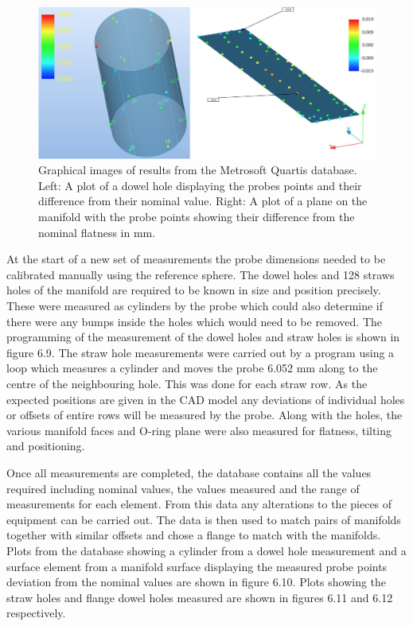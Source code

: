 \begin{figure}[th]
\centering
\includegraphics[scale=0.4]{Figures/cmmresults.png}
\decoRule
\caption{Graphical images of results from the Metrosoft Quartis database. Left: A plot of a dowel hole displaying the probes points and their difference from their nominal value. Right: A plot of a plane on the manifold with the probe points showing their difference from the nominal flatness in mm.}
\label{fig:cmmresults}
\end{figure}

At the start of a new set of measurements the probe dimensions needed to be calibrated manually using the reference sphere. The dowel holes and 128 straws holes of the manifold are required to be known in size and position precisely. These were measured as cylinders by the probe which could also determine if there were any bumps inside the holes which would need to be removed. The programming of the measurement of the dowel holes and straw holes is shown in figure 6.9. The straw hole measurements were carried out by a program using a loop which measures a cylinder and moves the probe 6.052 mm along to the centre of the neighbouring hole. This was done for each straw row. As the expected positions are given in the CAD model any deviations of individual holes or offsets of entire rows will be measured by the probe. Along with the holes, the various manifold faces and O-ring plane were also measured for flatness, tilting and positioning.

Once all measurements are completed, the database contains all the values required including nominal values, the values measured and the range of measurements for each element. From this data any alterations to the pieces of equipment can be carried out. The data is then used to match pairs of manifolds together with similar offsets and chose a flange to match with the manifolds. Plots from the database showing a cylinder from a dowel hole measurement and a surface element from a manifold surface displaying the measured probe points deviation from the nominal values are shown in figure 6.10. Plots showing the straw holes and flange dowel holes measured are shown in figures 6.11 and 6.12 respectively.

